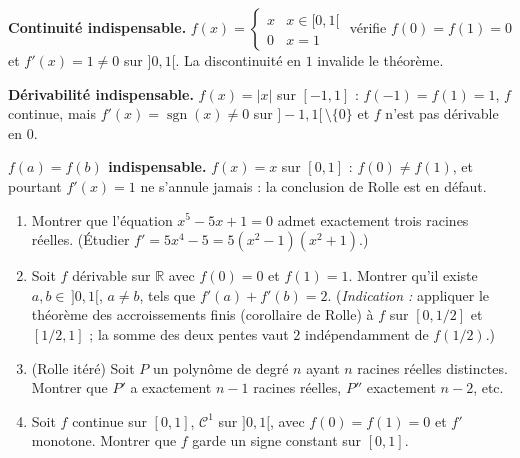 \vspace{6pt}

\begin{mdframed}[style=cexbar]
  \textbf{Continuité indispensable.}\enspace%
  $f(x) = \begin{cases}x & x\in[0,1[\\ 0 & x=1\end{cases}$
  vérifie $f(0)=f(1)=0$ et $f'(x)=1\neq 0$ sur $]0,1[$. La discontinuité en $1$
  invalide le théorème.

  \smallskip\noindent
  \textbf{Dérivabilité indispensable.}\enspace%
  $f(x) = |x|$ sur $[-1,1]$ : $f(-1)=f(1)=1$, $f$ continue, mais
  $f'(x) = \operatorname{sgn}(x) \neq 0$ sur $]-1,1[\,\setminus\{0\}$
  et $f$ n'est pas dérivable en $0$.

  \smallskip\noindent
  \textbf{$f(a)=f(b)$ indispensable.}\enspace%
  $f(x) = x$ sur $[0,1]$ : $f(0)\neq f(1)$, et pourtant $f'(x)=1$ ne
  s'annule jamais : la conclusion de Rolle est en défaut.
\end{mdframed}

\vspace{6pt}
\exolabel

\begin{mdframed}[style=exobar]
  \begin{enumerate}
    \item Montrer que l'équation $x^5 - 5x + 1 = 0$ admet exactement trois
          racines réelles. (Étudier $f' = 5x^4 - 5 = 5(x^2-1)(x^2+1)$.)

    \item Soit $f$ dérivable sur $\mathbb{R}$ avec $f(0)=0$ et $f(1)=1$.
          Montrer qu'il existe $a,b \in\,]0,1[$, $a\neq b$, tels que
          $f'(a)+f'(b)=2$. (\textit{Indication :} appliquer le théorème des
          accroissements finis (corollaire de Rolle) à $f$ sur $[0,1/2]$ et
          $[1/2,1]$ ; la somme des deux pentes vaut $2$ indépendamment de $f(1/2)$.)

    \item (Rolle itéré) Soit $P$ un polynôme de degré $n$ ayant $n$ racines
          réelles distinctes. Montrer que $P'$ a exactement $n-1$ racines réelles,
          $P''$ exactement $n-2$, etc.

    \item Soit $f$ continue sur $[0,1]$, $\mathcal{C}^1$ sur $]0,1[$, avec
          $f(0)=f(1)=0$ et $f'$ monotone. Montrer que $f$ garde un signe constant
          sur $[0,1]$.
  \end{enumerate}
\end{mdframed}

